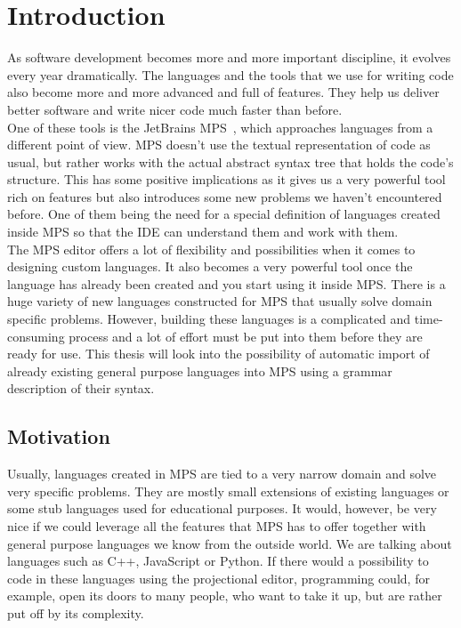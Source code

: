 \chapter{Introduction}

As software development becomes more and more important discipline, it evolves every year dramatically.
The languages and the tools that we use for writing code also become more and more advanced and full of features.
They help us deliver better software and write nicer code much faster than before.
\\

One of these tools is the JetBrains MPS~\cite{MPS}, which approaches languages from a different point of view.
MPS doesn't use the textual representation of code as usual, but rather works with the actual abstract syntax tree that holds the code's structure.
This has some positive implications as it gives us a very powerful tool rich on features but also introduces some new problems we haven't encountered before.
One of them being the need for a special definition of languages created inside MPS so that the IDE can understand them and work with them.
\\

The MPS editor offers a lot of flexibility and possibilities when it comes to designing custom languages.
It also becomes a very powerful tool once the language has already been created and you start using it inside MPS.
There is a huge variety of new languages constructed for MPS that usually solve domain specific problems.
However, building these languages is a complicated and time-consuming process and a lot of effort must be put into them before they are ready for use.
This thesis will look into the possibility of automatic import of already existing general purpose languages into MPS using a grammar description of their syntax.

\section{Motivation}

Usually, languages created in MPS are tied to a very narrow domain and solve very specific problems.
They are mostly small extensions of existing languages or some stub languages used for educational purposes.
It would, however, be very nice if we could leverage all the features that MPS has to offer together with general purpose languages we know from the outside world.
We are talking about languages such as C++, JavaScript or Python.
If there would a possibility to code in these languages using the projectional editor, programming could, for example, open its doors to many people, who want to take it up, but are rather put off by its complexity.
\\


